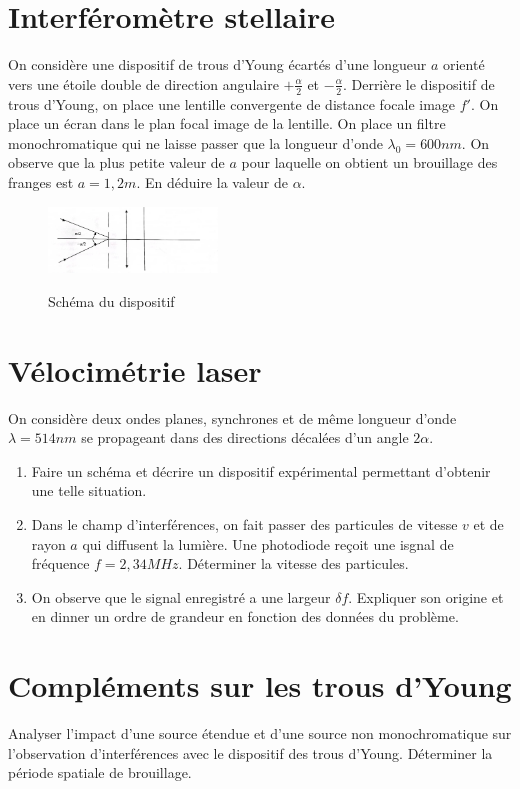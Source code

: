 \documentclass{article}
\begin{document}
\section{Interféromètre stellaire}
On considère une dispositif de trous d'Young écartés d'une longueur $a$ orienté vers une étoile double de direction angulaire $+ \frac{\alpha}{2}$ et $- \frac{ \alpha}{2}$. 
Derrière le dispositif de trous d'Young, on place une lentille convergente de distance focale image $f'$. 
On place un écran dans le plan focal image de la lentille. 
On place un filtre monochromatique qui ne laisse passer que la longueur d'onde $\lambda_0 = 600nm.$
On observe que la plus petite valeur de $a$ pour laquelle on obtient un brouillage des franges est $a=1,2m$. 
En déduire la valeur de $\alpha$. 



\begin{figure}[h!]
  \centering
  \includegraphics[width=0.4\textwidth]{interféromètre stellaire .jpg}
  \label{fig:maison}
    \caption{Schéma du dispositif}
\end{figure}

\section{Vélocimétrie laser}

On considère deux ondes planes, synchrones et de même longueur d'onde $\lambda = 514 nm$ se propageant dans des directions décalées d'un angle $2 \alpha$. 
\begin{enumerate}
  \item Faire un schéma et décrire un dispositif expérimental permettant d'obtenir une telle situation. 
  \item Dans le champ d'interférences, on fait passer des particules de vitesse $v$ et de rayon $a$ qui diffusent la lumière. Une photodiode reçoit une isgnal de fréquence $f=2,34MHz$. Déterminer la vitesse des particules. 
  \item On observe que le signal enregistré a une largeur $\delta f$. Expliquer son origine et en dinner un ordre de grandeur en fonction des données du problème. 
\end{enumerate} 

\section{Compléments sur les trous d'Young}

Analyser l'impact d'une source étendue et d'une source non monochromatique sur l'observation d'interférences avec le dispositif des trous d'Young. 
Déterminer la période spatiale de brouillage. 
\end{document}
